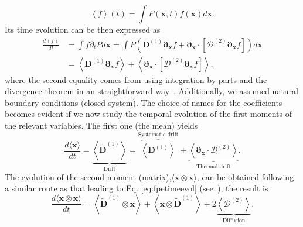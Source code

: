 \documentclass[twoside,openright,titlepage,numbers=noenddot,%
headinclude,footinclude,cleardoublepage=empty,abstract=on,
BCOR=5mm,fontsize=11pt, dvipsnames, paper=b5
]{scrreprt}
\renewcommand{\vec}[1]{\bm{#1}}
\newcommand{\tens}[1]{\bm{\mathcal{#1}}}
\begin{document}
\begin{equation}
  \left\langle f\right\rangle(t) = \int {P(\vec{x},t) f(\vec{x}) d\vec{x}}.
\end{equation}
Its time evolution can be then expressed as
\begin{equation}
\label{eq:fpetimeevol}  
  \begin{aligned}
    \frac{d\left\langle f\right\rangle}{dt} &= \int{f\partial_tPd\vec{x}} = \int{P\left(\vec{D}^{(1)}\vec{\partial}_{\vec{x}}f + \vec{\partial}_{\vec{x}}\cdot\left[\tens{D}^{(2)} \vec{\partial}_{\vec{x}}f\right]\right)d\vec{x}}\\
    &= \left\langle \vec{D}^{(1)} \vec{\partial}_{\vec{x}}f\right\rangle + \left\langle \vec{\partial}_{\vec{x}}\cdot\left[\tens{D}^{(2)}\vec\partial_{\vec{x}}f\right]\right\rangle,
  \end{aligned}
\end{equation}
where the second equality comes from using integration by parts and the divergence theorem in an straightforward way~\cite{Risken2012}. Additionally, we assumed natural boundary conditions (closed system).
The choice of names for the coefficients becomes evident if we now study the temporal evolution of the first moments of the relevant variables. The first one (the mean) yields
\begin{equation}
  \label{eq:fpemean}  
  \frac{d\langle\vec{x}\rangle}{dt} = \underbrace{\left\langle \widetilde{\vec{D}}^{(1)}\right\rangle}_{\text{Drift}} = \overbrace{\left\langle \vec{D}^{(1)}\right\rangle}^{\text{Systematic drift}} + \underbrace{\left\langle \vec{\partial}_{\vec{x}}\cdot\tens{D}^{(2)}\right\rangle}_{\text{Thermal drift}}.
\end{equation}
The evolution of the second moment (matrix),$\langle \vec{x}\otimes\vec{x}\rangle$, can be obtained following a similar route as that leading to Eq. \eqref{eq:fpetimeevol} (see~\cite{Risken2012}), the result is
\begin{equation}
  \label{eq:fpevar}
  \frac{d\langle \vec{x}\otimes\vec{x}\rangle}{dt} = \left\langle \widetilde{\vec{D}}^{(1)}\otimes\vec{x}\right\rangle + \left\langle \vec{x}\otimes\widetilde{\vec{D}}^{(1)}\right\rangle + 2\underbrace{\left\langle \tens{D}^{(2)}\right\rangle}_{\text{Diffusion}}.
\end{equation}
\end{document}
